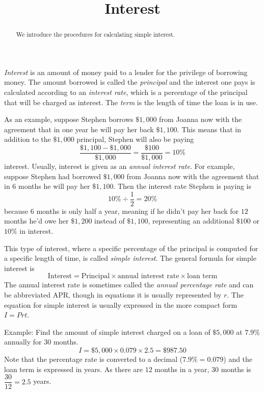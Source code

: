 \documentclass{ximera}
\title{Interest}
\begin{document}
\begin{abstract}
We introduce the procedures for calculating simple interest.
\end{abstract}
\maketitle


\emph{Interest} is an amount of money paid to a lender for the privilege of borrowing money. The amount borrowed is called the \emph{principal} and the interest one pays is calculated according to an \emph{interest rate}, which is a percentage of the principal that will be charged as interest. The \emph{term} is the length of time the loan is in use.

As an example, suppose Stephen borrows $\$1,000$ from Joanna now with the agreement that in one year he will pay her back $\$1,100$. This means that in addition to the $\$1,000$ principal, Stephen will also be paying
\[
\frac{\$1,100-\$1,000}{\$1,000}=\frac{\$100}{\$1,000}=10\%
\]
interest. Usually, interest is given as an \emph{annual interest rate}. For example, suppose Stephen had borrowed $\$1,000$ from Joanna now with the agreement that in $6$ months he will pay her $\$1,100$. Then the interest rate Stephen is paying is
\[
10\%\div \frac{1}{2}=20\%
\]
because $6$ months is only half a year, meaning if he didn't pay her back for $12$ months he'd owe her $\$1,200$ instead of $\$1,100$, representing an additional $\$100$ or $10\%$ in interest.

This type of interest, where a specific percentage of the principal is computed for a specific length of time, is called \emph{simple interest}. The general formula for simple interest is
\begin{equation}\label{simpleinterest}
\text{Interest}=\text{Principal}\times\text{annual interest rate}\times\text{loan term}
\end{equation}
The annual interest rate is sometimes called the \emph{annual percentage rate} and can be abbreviated APR, though in equations it is usually represented by $r$. The equation for simple interest is usually expressed in the more compact form $I=Prt$.

Example: Find the amount of simple interest charged on a loan of $\$5,000$ at $7.9\%$ annually for $30$ months.
$$
I=\$5,000\times 0.079\times 2.5=\$987.50
$$
Note that the percentage rate is converted to a decimal ($7.9\%=0.079$) and the loan term is expressed in years. As there are $12$ months in a year, $30$ months is $\dfrac{30}{12}=2.5$ years.
\end{document}
